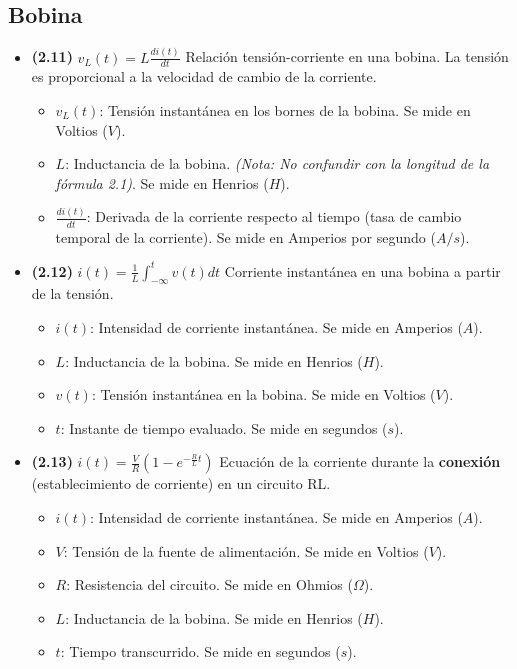 \documentclass{article}
\begin{document}
		\subsection*{Bobina}
			\begin{itemize}
				\item \textbf{(2.11)} $\boxed{v_L(t)=L\frac{di(t)}{dt}}$ Relación tensión-corriente en una bobina. La tensión es proporcional a la velocidad de cambio de la corriente.
					\begin{itemize}
						\item $v_L(t)$: Tensión instantánea en los bornes de la bobina. Se mide en Voltios ($V$).
						\item $L$: Inductancia de la bobina. \textit{(Nota: No confundir con la longitud de la fórmula 2.1)}. Se mide en Henrios ($H$).
						\item $\frac{di(t)}{dt}$: Derivada de la corriente respecto al tiempo (tasa de cambio temporal de la corriente). Se mide en Amperios por segundo ($A/s$).
					\end{itemize}

				\item \textbf{(2.12)} $\boxed{i(t)=\frac{1}{L}\int_{-\infty}^{t} v(t)dt}$ Corriente instantánea en una bobina a partir de la tensión.
					\begin{itemize}
						\item $i(t)$: Intensidad de corriente instantánea. Se mide en Amperios ($A$).
						\item $L$: Inductancia de la bobina. Se mide en Henrios ($H$).
						\item $v(t)$: Tensión instantánea en la bobina. Se mide en Voltios ($V$).
						\item $t$: Instante de tiempo evaluado. Se mide en segundos ($s$).
					\end{itemize}

				\item \textbf{(2.13)} $\boxed{i(t)=\frac{V}{R}(1-e^{-\frac{R}{L}t})}$ Ecuación de la corriente durante la \textbf{conexión} (establecimiento de corriente) en un circuito RL.
					\begin{itemize}
						\item $i(t)$: Intensidad de corriente instantánea. Se mide en Amperios ($A$).
						\item $V$: Tensión de la fuente de alimentación. Se mide en Voltios ($V$).
						\item $R$: Resistencia del circuito. Se mide en Ohmios ($\Omega$).
						\item $L$: Inductancia de la bobina. Se mide en Henrios ($H$).
						\item $t$: Tiempo transcurrido. Se mide en segundos ($s$).
					\end{itemize}


\end{itemize}
\end{document}

